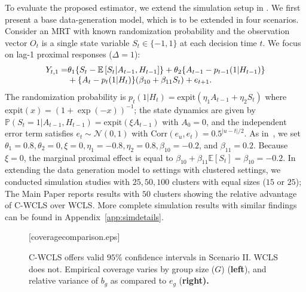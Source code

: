\documentclass[lineno]{biometrika}
\def\E{\mathbb{E}}
\begin{document}
To evaluate the proposed estimator, we extend the simulation setup in \cite{Boruvkaetal}. We first present a base data-generation model, which is to be extended in four scenarios. Consider an MRT with known randomization probability and the observation vector $O_t$ is a single state variable $S_t \in \{-1,1\}$ at each decision time $t$. We focus on lag-1 proximal responses ($\Delta = 1$):
\begin{equation}
\label{eq:generativemodel}
\begin{array}{r@{}l}
    Y_{t,1} = &{} \theta_1 \{S_t - \E \left[ S_t|A_{t-1},H_{t-1}\right]\} + \theta_2\{A_{t-1}-p_{t-1}(1|H_{t-1})\} \\
    &{}+ \{A_t - p_t(1|H_t)\}(\beta_{10} + \beta_{11} S_t)+  e_{t+1}.
\end{array}
\end{equation}
The randomization probability is $p_t(1|H_t) = \text{expit}(\eta_1 A_{t-1}+\eta_2 S_t)$ where $\text{expit}(x)=(1+\exp(-x))^{-1}$; the state dynamics are given by $\mathbb{P}(S_t=1|A_{t-1},H_{t-1})=\text{expit}(\xi A_{t-1})$ with $A_0 = 0$, and the independent error term satisfies $e_t \sim \mathcal{N}(0,1)$ with $\text{Corr}(e_u, e_t) = 0.5^{|u-t|/2}$. As in~\cite{Boruvkaetal}, we set $\theta_1=0.8, \theta_2 = 0, \xi=0, \eta_1 = -0.8, \eta_2 = 0.8, \beta_{10}=-0.2$, and $\beta_{11} = 0.2$. Because $\xi=0$, the marginal proximal effect is equal to $\beta_{10} + \beta_{11} \E \left[S_t \right]=\beta_{10} = -0.2$. 
In extending the data generation model to settings with clustered settings, we conducted simulation studies with $25, 50, 100$ clusters with equal sizes ($15$ or $25$); The Main Paper reports results with $50$ clusters showing the relative advantage of C-WCLS over WCLS. More complete simulation results with similar findings can be found in Appendix~\ref{app:simdetails}.


\begin{figure}
  \centering
  \figurebox{15pc}{20pc}{}[coveragecomparison.eps]
  \caption{C-WCLS offers valid $95\%$ confidence intervals in Scenario II. WCLS does not. Empirical coverage varies by group size  ($G$) ({\bf left}), and relative variance of $b_g$ as compared to $e_g$ (\bf right).}
  \label{fig:undercoverage}
\end{figure}
\end{document}
